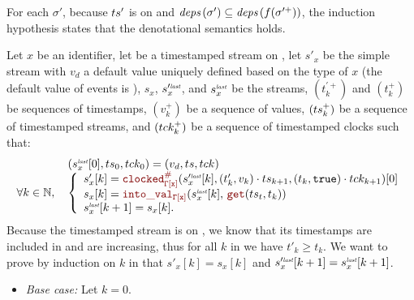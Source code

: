 \begin{skippableproof}
    For each $\sigma'$, because $ts'$ is on \tck and ${\textit{deps}\left(\sigma'\right)} \subseteq {\ensuremath{\textit{deps}\left(f(
            \sigma^{\prime+})\right)}}$, the induction hypothesis states that the denotational semantics
     holds.

    Let $x$ be an identifier, let \ts be a timestamped stream on \tck, let $s'_x$ be the simple
    stream  with $v_d$ a default value uniquely defined based on
    the type of $x$ (the default value of events is \none), $s_x$, $s^{\prime{\textit{\tiny last}}}_x$, and
    $s^{{\textit{\tiny last}}}_x$ be the streams, $(t_k^{\prime+})$ and $(t_k^+)$ be sequences of timestamps,
    $(v_k^+)$ be a sequence of values, $(ts_k^+)$ be a sequence of timestamped streams, and
    $(tck_k^+)$ be a sequence of timestamped clocks such that:
    \begin{equation*}
        \begin{array}{ll}
                                 & (s^{\explast}_x[0], \ts_{0}, \tck_{0}) = (v_d, \ts, \tck) \\
            \forall k \in \N, \, &
            \left\{
            \begin{array}{l}
                s'_x[k] = \clocked{\tyCtx[x]}{s^{\prime\explast}_x[k]}{(t'_k, v_k) \next \ts_{k+1}}{(t_k, \true) \next \tck_{k+1}}[0] \\
                s_x[k] = \intoVal{\tyCtx[x]}{s^{\explast}_x[k]}{\getAt{\ts_t}{t_k}}                                                   \\
                s^{\explast}_x[k+1] = s_x[k].                                                                                         \\
            \end{array}
            \right.
        \end{array}
    \end{equation*}
    Because the timestamped stream \ts is on \tck, we know that its timestamps are included in
    \tck and are increasing, thus for all $k$ in \N we have $t'_k \ge t_k$.
    We want to prove by induction on $k$ in \N that $s'_x[k] = s_x[k]$ and
    $s^{\prime{\textit{\tiny last}}}_x[k+1] = s^{{\textit{\tiny last}}}_x[k+1]$.
    \begin{itemize}
        \item \textit{Base case:} Let $k = 0$.

\end{itemize}
\end{skippableproof}
